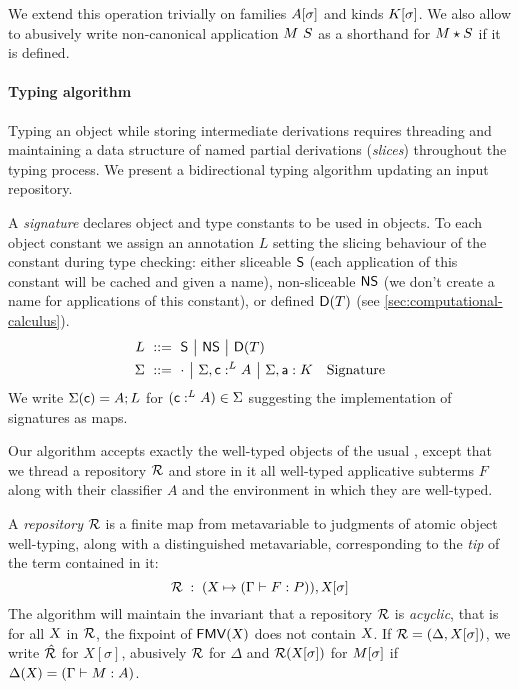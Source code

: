 \documentclass{llncs}
\begin{document}
We extend this operation trivially on families ${A}[{\sigma}]$ and
kinds ${K}[{\sigma}]$. We also allow to abusively write
non-canonical application ${M}\  S$ as a shorthand for ${M}\star{S}$
if it is defined.


\paragraph{Typing algorithm}

Typing an object while storing intermediate derivations requires
threading and maintaining a data structure of named partial
derivations (\emph{slices}) throughout the typing process. We present
a bidirectional typing algorithm updating an input repository.

A \emph{signature} declares object and type constants to be used in
objects. To each object constant we assign an annotation $L$ setting
the slicing behaviour of the constant during type checking: either
sliceable $\mathsf{S}$ (each application of this constant will be
cached and given a name), non-sliceable $\mathsf{NS}$ (we don't
create a name for applications of this constant), or defined
$\mathsf{D}({T})$ (see \ref{sec:computational-calculus}).
\begin{align*}
  L &\ ::=\ 
  \mathsf{S} \ {\big|}\ 
  \mathsf{NS} \ {\big|}\ 
  \mathsf{D}({T})
  \\
  \Sigma &\ ::=\ 
  \cdot \ {\big|}\ 
  {\Sigma},{\text{\textsf{c}} :^L A} \ {\big|}\ 
  {\Sigma},{\text{\textsf{a}} : K}
  &\text{Signature}
\end{align*}
We write $\Sigma(\text{\textsf{c}}) = A; L$ for $(\text{\textsf{c}} :^L A) \in \Sigma$
suggesting the implementation of signatures as maps.

Our algorithm accepts exactly the well-typed objects of the usual \LF,
except that we thread a repository $\mathcal{R}$ and store in it all
well-typed applicative subterms $F$ along with their classifier $A$
and the environment in which they are well-typed.


A \emph{repository} $\mathcal{R}$ is a finite map from metavariable to
judgments of atomic object well-typing, along with a distinguished
metavariable, corresponding to the \emph{tip} of the term contained in
it:
$$ \mathcal{R}\;:\;(\text{\textsl{X}} \mapsto (\Gamma\vdash{F}:{P})), {\text{\textsl{X}}}[{\sigma}] $$
The algorithm will maintain the invariant that a repository
$\mathcal{R}$ is \emph{acyclic}, that is for all $\text{\textsl{X}}$ in $\mathcal{R}$, the
fixpoint of ${\text{\textsf{FMV}}}({\text{\textsl{X}}})$ does not contain $\text{\textsl{X}}$. If $\mathcal{R} =
(\Delta, X[\sigma])$, we write $\hat {\mathcal{R}}$ for $X[\sigma]$, abusively
$\mathcal{R}$ for $\Delta$ and $\mathcal{R} ({\text{\textsl{X}}}[{\sigma}])$ for ${M}[{\sigma}]$
if $\Delta(\text{\textsl{X}}) = (\Gamma\vdash M : A)$.
\end{document}
